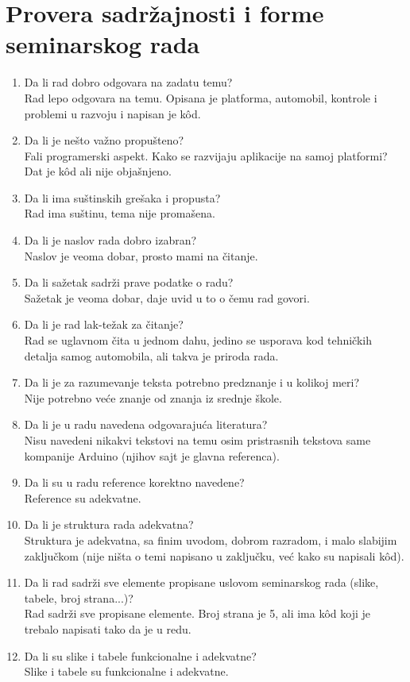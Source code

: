 \documentclass[a4paper]{article}
\begin{document}
	\section{Provera sadržajnosti i forme seminarskog rada}
	
	\begin{enumerate}
		\item Da li rad dobro odgovara na zadatu temu?\\ Rad lepo odgovara na temu. Opisana je platforma, automobil, kontrole i problemi u razvoju i napisan je k\^ od.
		\item Da li je nešto važno propušteno?\\ Fali programerski aspekt. Kako se razvijaju aplikacije na samoj platformi? Dat je k\^ od ali nije objašnjeno.
		\item Da li ima suštinskih grešaka i propusta?\\Rad ima suštinu, tema nije promašena.
		\item Da li je naslov rada dobro izabran?\\ Naslov je veoma dobar, prosto mami na čitanje.
		\item Da li sažetak sadrži prave podatke o radu?\\ Sažetak je veoma dobar, daje uvid u to o čemu rad govori.
		\item Da li je rad lak-težak za čitanje?\\ Rad se uglavnom čita u jednom dahu, jedino se usporava kod tehničkih detalja samog automobila, ali takva je priroda rada.
		\item Da li je za razumevanje teksta potrebno predznanje i u kolikoj meri?\\ Nije potrebno veće znanje od znanja iz srednje škole.
		\item Da li je u radu navedena odgovarajuća literatura?\\ Nisu navedeni nikakvi tekstovi na temu osim pristrasnih tekstova same kompanije Arduino (njihov sajt je glavna referenca).
		\item Da li su u radu reference korektno navedene?\\ Reference su adekvatne.
		\item Da li je struktura rada adekvatna?\\ Struktura je adekvatna, sa finim uvodom, dobrom razradom, i malo slabijim zaključkom (nije ništa o temi napisano u zaključku, već kako su napisali k\^ od).
		\item Da li rad sadrži sve elemente propisane uslovom seminarskog rada (slike, tabele, broj strana...)?\\ Rad sadrži sve propisane elemente. Broj strana je 5, ali ima k\^ od koji je trebalo napisati tako da je u redu.
		\item Da li su slike i tabele funkcionalne i adekvatne?\\ Slike i tabele su funkcionalne i adekvatne.
	\end{enumerate}
	
\end{document}
